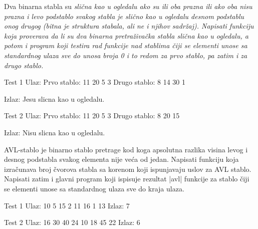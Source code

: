 \begin{Answer}[ref=712]
\end{Answer}



\begin{Exercise}[label=713]
Dva binarna stabla su \em{slična kao u ogledalu} ako su ili oba prazna ili ako oba nisu prazna i levo podstablo svakog stabla je \em{slično kao u ogledalu} desnom podstablu onog drugog (bitna je struktura stabala, ali ne i njihov sadržaj). Napisati funkciju koja proverava da li su dva binarna pretraživačka stabla \em{slična kao u ogledalu}, a potom i program koji testira rad funkcije nad stablima čiji se elementi unose sa standardnog ulaza sve do unosa broja 0 i to redom za prvo stablo, pa zatim i za drugo stablo. 

\begin{miditest}
\begin{test}{Test 1}
Ulaz: 
Prvo stablo: 11 20 5 3
Drugo stablo: 8 14 30 1

Izlaz: 
Jesu slicna kao u ogledalu.
\end{test}
\end{miditest}

\begin{miditest}
\begin{test}{Test 2}
Ulaz: 
Prvo stablo: 11 20 5 3
Drugo stablo: 8 20 15

Izlaz: 
Nisu slicna kao u ogledalu.
\end{test}
\end{miditest}
\end{Exercise}

\begin{Answer}[ref=713]
\end{Answer}


\begin{Exercise}[label=714]
AVL-stablo je binarno stablo pretrage kod koga apsolutna razlika visina levog i desnog podstabla svakog elementa
nije veća od jedan. Napisati funkciju  koja izračunava broj čvorova stabla sa korenom  koji ispunjavaju uslov za AVL stablo. Napisati zatim i glavni program koji ispisuje rezultat \kckod|avl| funkcije za stablo čiji se elementi unose sa standardnog ulaza sve do kraja ulaza.

\begin{miditest}
\begin{test}{Test 1}
Ulaz: 
10 5 15 2 11 16 1 13
Izlaz: 
7
\end{test}
\end{miditest}

\begin{miditest}
\begin{test}{Test 2}
Ulaz: 
16 30 40 24 10 18 45 22
Izlaz: 
6
\end{test}
\end{miditest}
\end{Exercise}

